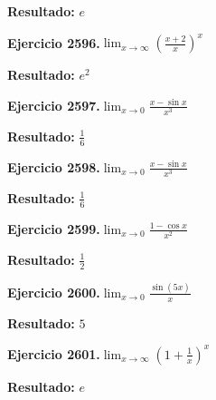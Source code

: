 \documentclass[10pt,a4paper]{article}
\begin{document}
\begin{solbox}
\textbf{Resultado:} \(\displaystyle e\)
\end{solbox}

\begin{ejbox}
\textbf{Ejercicio 2596.}\quad $\lim_{x\to \infty} \left(\frac{x+2}{x}\right)^{x}$
\end{ejbox}

\begin{solbox}
\textbf{Resultado:} \(\displaystyle e^{2}\)
\end{solbox}

\begin{ejbox}
\textbf{Ejercicio 2597.}\quad $\lim_{x\to 0} \frac{x-\sin x}{x^3}$
\end{ejbox}

\begin{solbox}
\textbf{Resultado:} \(\displaystyle \frac{1}{6}\)
\end{solbox}

\newpage
\begin{ejbox}
\textbf{Ejercicio 2598.}\quad $\lim_{x\to 0} \frac{x-\sin x}{x^3}$
\end{ejbox}

\begin{solbox}
\textbf{Resultado:} \(\displaystyle \frac{1}{6}\)
\end{solbox}

\begin{ejbox}
\textbf{Ejercicio 2599.}\quad $\lim_{x\to 0} \frac{1-\cos x}{x^2}$
\end{ejbox}

\begin{solbox}
\textbf{Resultado:} \(\displaystyle \frac{1}{2}\)
\end{solbox}

\begin{ejbox}
\textbf{Ejercicio 2600.}\quad $\lim_{x\to 0} \frac{\sin(5x)}{x}$
\end{ejbox}

\begin{solbox}
\textbf{Resultado:} \(\displaystyle 5\)
\end{solbox}

\newpage
\begin{ejbox}
\textbf{Ejercicio 2601.}\quad $\lim_{x\to \infty} \left(1+\frac{1}{x}\right)^x$
\end{ejbox}

\begin{solbox}
\textbf{Resultado:} \(\displaystyle e\)
\end{solbox}
\end{document}
